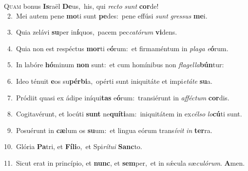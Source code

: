 \lettrine{\initial\textcolor{\initialcolor}{Q}}{uam} bonus \textbf{Is}\-raël \textbf{De}\-us,~\star his, qui \textit{rec}\-\textit{to} \textit{sunt} \textbf{cor}\-de!\\
{\numbfont\textcolor{\numbcolor}{~2.}}~Mei autem pene \textbf{mo}\-ti sunt \textbf{pe}\-des:~\star pene effúsi \textit{sunt} \textit{gres}\-\textit{sus} \textbf{me}\-i.\par
{\numbfont\textcolor{\numbcolor}{~3.}}~Quia zelávi \textbf{su}\-per in\-\textbf{í}\-quos,~\star pacem pec\-\textit{ca}\-\textit{tó}\textit{rum} \textbf{vi}\-dens.\par
{\numbfont\textcolor{\numbcolor}{~4.}}~Quia non est respéctus \textbf{mor}\-ti e\-\textbf{ó}\-rum:~\star et firmaméntum in \textit{pla}\-\textit{ga} \textit{e}\-\textbf{ó}rum.\par
{\numbfont\textcolor{\numbcolor}{~5.}}~In labóre \textbf{hó}\-minum \textbf{non} sunt:~\star et cum homínibus non \textit{fla}\-\textit{gel}\textit{la}\textbf{bún}tur:\par
{\numbfont\textcolor{\numbcolor}{~6.}}~Ideo ténuit \textbf{e}\-os su\-\textbf{pér}\-\textbf{bi}a,~\star opérti sunt iniquitáte et impi\-\textit{e}\-\textit{tá}\textit{te} \textbf{su}\-a.\par
{\numbfont\textcolor{\numbcolor}{~7.}}~Pródiit quasi ex ádipe iníqui\textbf{tas} e\-\textbf{ó}\-rum:~\star transiérunt in \textit{af}\-\textit{féc}\textit{tum} \textbf{cor}\-dis.\par
{\numbfont\textcolor{\numbcolor}{~8.}}~Cogitavérunt, et locúti \textbf{sunt} ne\-\textbf{quí}\-\textbf{ti}am:~\star iniquitátem in ex\-\textit{cél}\-\textit{so} \textit{lo}\-\textbf{cú}ti sunt.\par
{\numbfont\textcolor{\numbcolor}{~9.}}~Posuérunt in \textbf{cæ}\-lum os \textbf{su}\-um:~\star et lingua eórum trans\-\textit{í}\-\textit{vit} \textit{in} \textbf{ter}\-ra.\par
{\numbfont\textcolor{\numbcolor}{10.}}~Glória \textbf{Pa}\-tri, et \textbf{Fí}\-\textbf{li}o,~\star et Spi\-\textit{rí}\-\textit{tu}\textit{i} \textbf{Sanc}\-to.\par
{\numbfont\textcolor{\numbcolor}{11.}}~Sicut erat in princípio, et \textbf{nunc}\-, et \textbf{sem}\-per,~\star et in sǽcula sæ\-\textit{cu}\-\textit{ló}\textit{rum}. \textbf{A}\-men.\par
